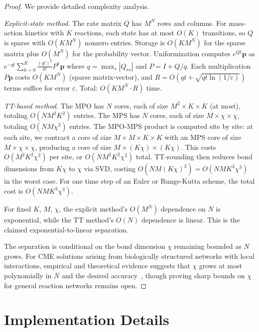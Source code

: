 \documentclass[11pt]{article}
\newcommand{\eps}{\varepsilon}
\begin{document}
\begin{proof}
We provide detailed complexity analysis.

\emph{Explicit-state method.}
The rate matrix $Q$ has $M^N$ rows and columns.
For mass-action kinetics with $K$ reactions, each state has at most
$O(K)$ transitions, so $Q$ is sparse with $O(KM^N)$ nonzero entries.
Storage is $O(KM^N)$ for the sparse matrix plus $O(M^N)$ for the
probability vector.
Uniformization computes $e^{Qt}\mathbf{p}$ as
$e^{-qt}\sum_{k=0}^{R}\frac{(qt)^k}{k!}P^k\mathbf{p}$
where $q = \max_s |Q_{ss}|$ and $P = I + Q/q$.
Each multiplication $P\mathbf{p}$ costs $O(KM^N)$ (sparse matrix-vector),
and $R = O(qt + \sqrt{qt\ln(1/\eps)})$ terms suffice for error $\eps$.
Total: $O(KM^N \cdot R)$ time.

\emph{TT-based method.}
The MPO has $N$ cores, each of size $M^2 \times K \times K$
(at most), totaling $O(NM^2 K^2)$ entries.
The MPS has $N$ cores, each of size $M \times \chi \times \chi$,
totaling $O(NM\chi^2)$ entries.
The MPO-MPS product is computed site by site:
at each site, we contract a core of size
$M \times M \times K \times K$ with an MPS core of size
$M \times \chi \times \chi$, producing a core of size
$M \times (K\chi) \times (K\chi)$.
This costs $O(M^2 K^2 \chi^2)$ per site, or $O(NM^2K^2\chi^2)$ total.
TT-rounding then reduces bond dimensions from $K\chi$ to $\chi$ via SVD,
costing $O(NM(K\chi)^3) = O(NMK^3\chi^3)$ in the worst case.
For one time step of an Euler or Runge-Kutta scheme, the total
cost is $O(NMK^3\chi^3)$.

For fixed $K$, $M$, $\chi$, the explicit method's $O(M^N)$ dependence
on $N$ is exponential, while the TT method's $O(N)$ dependence is
linear.
This is the claimed exponential-to-linear separation.

The separation is conditional on the bond dimension $\chi$ remaining
bounded as $N$ grows.
For CME solutions arising from biologically structured networks
with local interactions, empirical and theoretical evidence suggests
that $\chi$ grows at most polynomially in $N$ and the desired
accuracy~\cite{kazeev2014,ion2021}, though proving sharp bounds
on $\chi$ for general reaction networks remains open.
\end{proof}

\section{Implementation Details}\label{app:implementation}
\end{document}
